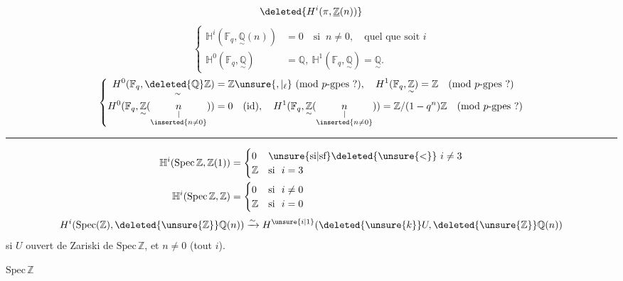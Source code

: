\[
\deleted{H^i(\pi,\underline{\mathbb{Z}}(n))}
\]
\[
\left\{\begin{aligned}
\mathbb{H}^i(\mathbb{F}_q,\underset{\sim}{\mathbb{Q}}(n))&=0\quad\text{si }\ n\ne0,\quad\text{quel que soit }i\\
\mathbb{H}^0(\mathbb{F}_q,\underset{\sim}{\mathbb{Q}})&=\mathbb{Q},\ \mathbb{H}^1(\mathbb{F}_q,\underset{\sim}{\mathbb{Q}})=\underset{\sim}{\mathbb{Q}}.
\end{aligned}\right.
\]
\[
\left\{\begin{aligned}
H^0(\mathbb{F}_q,\underset{\sim}{\deleted{\mathbb{Q}}\mathbb{Z}})&=\mathbb{Z}\unsure{,|{}_\ell}\ (\text{mod }p\text{-gpes }?),\quad H^1(\mathbb{F}_q,\underset{\sim}{\mathbb{Z}})=\mathbb{Z}\quad(\text{mod }p\text{-gpes }?)\\
H^0(\mathbb{F}_q,\underset{\sim}{\mathbb{Z}}(\underset{\substack{\vert\\\inserted{n\ne0}}}{n}))&=0\quad(\text{id}),\quad H^1(\mathbb{F}_q,\underset{\sim}{\mathbb{Z}}(\underset{\substack{\vert\\\inserted{n\ne0}}}{n}))=\mathbb{Z}/(1-q^n)\mathbb{Z}\quad(\text{mod }p\text{-gpes }?)
\end{aligned}\right.
\]

\noindent\rule{.76\linewidth}{.35pt}
\[
\begin{aligned}
\mathbb{H}^i(\mathrm{Spec}\,\mathbb{Z},\mathbb{Z}(1))&=\begin{cases}0&\text{\unsure{si|sf}}\deleted{\unsure{<}}\ i\ne3\\\mathbb{Z}&\text{si }\ i=3\end{cases}\\
\mathbb{H}^i(\mathrm{Spec}\,\mathbb{Z},\mathbb{Z})&=\begin{cases}0&\text{si }\ i\ne0\\\mathbb{Z}&\text{si }\ i=0\end{cases}
\end{aligned}
\]
\[
H^i(\mathrm{Spec}(\mathbb{Z}),\deleted{\unsure{\mathbb{Z}}}\mathbb{Q}(n))\xrightarrow{\sim} H^{\unsure{i|1}}(\deleted{\unsure{k}}U,\deleted{\unsure{\mathbb{Z}}}\mathbb{Q}(n))
\]
si $U$ ouvert de Zariski de $\mathrm{Spec}\,\mathbb{Z}$, et $n\ne0$ (tout $i$).


$\mathrm{Spec}\,\mathbb{Z}$

